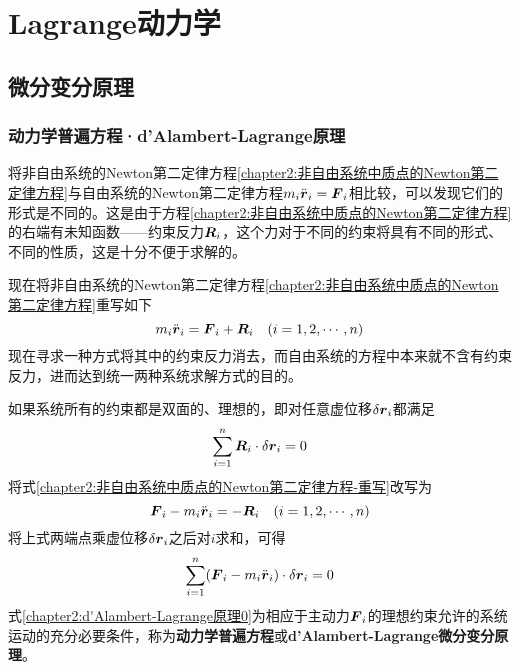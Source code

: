 \chapter{Lagrange动力学}

\section{微分变分原理}\label{chapter2:section-微分变分原理}

\subsection{动力学普遍方程·d'Alambert-Lagrange原理}

将非自由系统的Newton第二定律方程\eqref{chapter2:非自由系统中质点的Newton第二定律方程}与自由系统的Newton第二定律方程$m_i\ddot{\boldsymbol{r}}_i=\boldsymbol{F}_i$相比较，可以发现它们的形式是不同的。这是由于方程\eqref{chapter2:非自由系统中质点的Newton第二定律方程}的右端有未知函数——约束反力$\boldsymbol{R}_i$，这个力对于不同的约束将具有不同的形式、不同的性质，这是十分不便于求解的。

现在将非自由系统的Newton第二定律方程\eqref{chapter2:非自由系统中质点的Newton第二定律方程}重写如下
\begin{equation}
	m_i\ddot{\boldsymbol{r}}_i = \boldsymbol{F}_i+\boldsymbol{R}_i\quad (i=1,2,\cdots,n)
	\label{chapter2:非自由系统中质点的Newton第二定律方程-重写}
\end{equation}
现在寻求一种方式将其中的约束反力消去，而自由系统的方程中本来就不含有约束反力，进而达到统一两种系统求解方式的目的。

如果系统所有的约束都是双面的、理想的，即对任意虚位移$\delta\boldsymbol{r}_i$都满足
\begin{equation}
	\sum_{i=1}^n\boldsymbol{R}_i \cdot \delta\boldsymbol{r}_i=0
	\label{chapter2:理想约束假设-重写}
\end{equation}
将式\eqref{chapter2:非自由系统中质点的Newton第二定律方程-重写}改写为
\begin{equation*}
	\boldsymbol{F}_i - m_i \ddot{\boldsymbol{r}}_i = -\boldsymbol{R}_i \quad (i=1,2,\cdots,n)
\end{equation*}
将上式两端点乘虚位移$\delta\boldsymbol{r}_i$之后对$i$求和，可得
\begin{equation}
	\sum_{i=1}^n(\boldsymbol{F}_i - m_i \ddot{\boldsymbol{r}}_i) \cdot \delta \boldsymbol{r}_i = 0
	\label{chapter2:d'Alambert-Lagrange原理0}
\end{equation}
式\eqref{chapter2:d'Alambert-Lagrange原理0}为相应于主动力$\boldsymbol{F}_i$的理想约束允许的系统运动的充分必要条件，称为{\bf 动力学普遍方程}或{\bf d'Alambert-Lagrange微分变分原理}。


